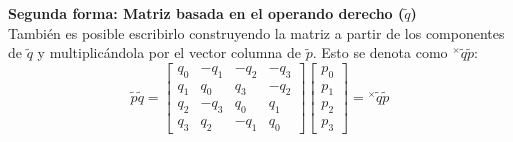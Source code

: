 \vspace{0.5cm}
\textbf{Segunda forma: Matriz basada en el operando derecho ($\tilde{q}$)} \\
También es posible escribirlo construyendo la matriz a partir de los componentes de $\tilde{q}$ y multiplicándola por el vector columna de $\tilde{p}$. Esto se denota como ${}^{\times}\tilde{q}\tilde{p}$:
\begin{equation}
    \tilde{p}\tilde{q} = 
    \begin{bmatrix}
        q_0 & -q_1 & -q_2 & -q_3 \\
        q_1 &  q_0 &  q_3 & -q_2 \\
        q_2 & -q_3 &  q_0 &  q_1 \\
        q_3 &  q_2 & -q_1 &  q_0
    \end{bmatrix}
    \begin{bmatrix}
        p_0 \\ p_1 \\ p_2 \\ p_3
    \end{bmatrix}
    = {}^{\times}\tilde{q}\tilde{p}
\end{equation}

